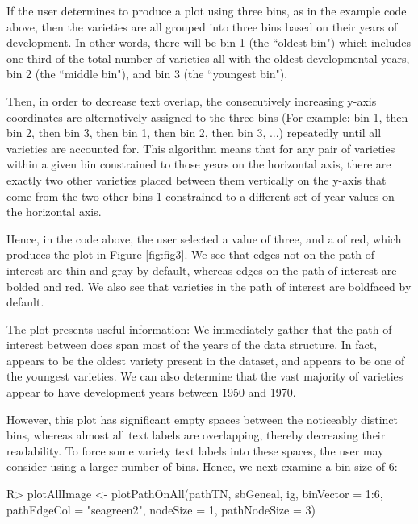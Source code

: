 \documentclass[article,shortnames]{jss}
\begin{document}
If the user determines to produce a plot using three bins, as in the example code above, then the varieties are all grouped into three bins based on their years of development. In other words, there will be bin 1 (the ``oldest bin") which includes one-third of the total number of varieties all with the oldest developmental years, bin 2 (the ``middle bin"), and bin 3 (the ``youngest bin").

Then, in order to decrease text overlap, the consecutively increasing y-axis coordinates are alternatively assigned to the three bins (For example: bin 1, then bin 2, then bin 3, then bin 1, then bin 2, then bin 3, ...) repeatedly until all varieties are accounted for. This algorithm means that for any pair of varieties within a given bin constrained to those years on the horizontal axis, there are exactly two other varieties placed between them vertically on the y-axis that come from the two other bins 1 constrained to a different set of year values on the horizontal axis.

Hence, in the code above, the user selected a  value of three, and a  of red, which produces the plot in Figure \ref{fig:fig3}. We see that edges not on the path of interest are thin and gray by default, whereas edges on the path of interest are bolded and red. We also see that varieties in the path of interest are boldfaced by default.

The plot presents useful information: We immediately gather that the path of interest between does span most of the years of the data structure. In fact,  appears to be the oldest variety present in the dataset, and  appears to be one of the youngest varieties. We can also determine that the vast majority of varieties appear to have development years between 1950 and 1970.

However, this plot has significant empty spaces between the noticeably distinct bins, whereas almost all text labels are overlapping, thereby decreasing their readability. To force some variety text labels into these spaces, the user may consider using a larger number of bins. Hence, we next examine a bin size of 6:

\begin{Code}
R> plotAllImage <- plotPathOnAll(pathTN, sbGeneal, ig, binVector = 1:6,
  pathEdgeCol = "seagreen2", nodeSize = 1, pathNodeSize = 3)
\end{Code}
\end{document}
